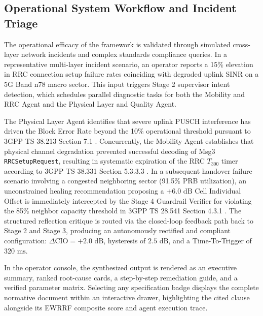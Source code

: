 \documentclass[conference]{IEEEtran}
\begin{document}
\subsection{Operational System Workflow and Incident Triage}
The operational efficacy of the framework is validated through simulated cross-layer network incidents and complex standards compliance queries. In a representative multi-layer incident scenario, an operator reports a 15\% elevation in RRC connection setup failure rates coinciding with degraded uplink SINR on a 5G Band n78 macro sector. This input triggers Stage 2 supervisor intent detection, which schedules parallel diagnostic tasks for both the Mobility and RRC Agent and the Physical Layer and Quality Agent.

The Physical Layer Agent identifies that severe uplink PUSCH interference has driven the Block Error Rate beyond the 10\% operational threshold pursuant to 3GPP TS 38.213 Section 7.1 \cite{ts38213}. Concurrently, the Mobility Agent establishes that physical channel degradation prevented successful decoding of Msg3 \texttt{RRCSetupRequest}, resulting in systematic expiration of the RRC $T_{300}$ timer according to 3GPP TS 38.331 Section 5.3.3.3 \cite{ts38331}. In a subsequent handover failure scenario involving a congested neighboring sector (91.5\% PRB utilization), an unconstrained healing recommendation proposing a $+6.0\text{ dB}$ Cell Individual Offset is immediately intercepted by the Stage 4 Guardrail Verifier for violating the 85\% neighbor capacity threshold in 3GPP TS 28.541 Section 4.3.1 \cite{ts28541}. The structured reflection critique is routed via the closed-loop feedback path back to Stage 2 and Stage 3, producing an autonomously rectified and compliant configuration: $\Delta\text{CIO} = +2.0\text{ dB}$, hysteresis of $2.5\text{ dB}$, and a Time-To-Trigger of $320\text{ ms}$.

In the operator console, the synthesized output is rendered as an executive summary, ranked root-cause cards, a step-by-step remediation guide, and a verified parameter matrix. Selecting any specification badge displays the complete normative document within an interactive drawer, highlighting the cited clause alongside its EWRRF composite score and agent execution trace.
\end{document}

